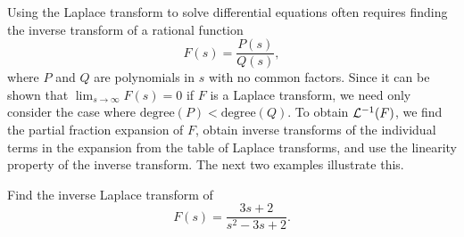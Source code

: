 \color{blue}
\color{black}


\noindent
Using the Laplace transform to solve differential equations often requires finding the inverse
transform of a rational function
\[
  F(s)=\frac{P(s)}{Q(s)},
\]
where $P$ and $Q$ are polynomials in $s$ with no common factors. Since it can be shown that
$\lim_{s\to\infty}F(s)=0$ if $F$ is a Laplace transform, we need only consider the case where
$\mbox{degree}(P)<\mbox{degree}(Q)$. To obtain ${\cal L}^{-1}(F)$, we find the partial fraction
expansion of $F$, obtain inverse transforms of the individual terms in the expansion from the table
of Laplace transforms, and use the linearity property of the inverse transform. The next two
examples illustrate this.

\begin{example}
  \label{example:8.2.4}\rm Find the inverse Laplace transform of
  \begin{equation}
    \label{eq:8.2.1}F(s)=\frac{3s+2}{s^{2}-3s+2}.
  \end{equation}
\end{example}

